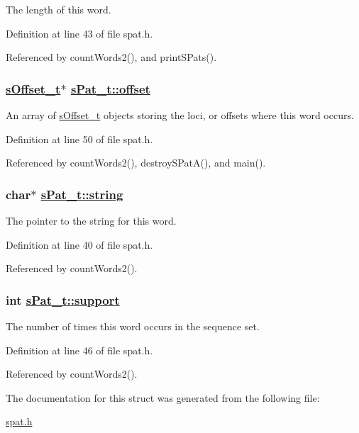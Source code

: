 The length of this word.

Definition at line 43 of file spat.h.

Referenced by count\-Words2(), and print\-SPats().\hypertarget{structsPat__t_o3}{
\subsubsection[offset]{\setlength{\rightskip}{0pt plus 5cm}\hyperlink{structsOffset__t}{s\-Offset\_\-t}$\ast$ \hyperlink{structsPat__t_o3}{s\-Pat\_\-t::offset}}}
\label{structsPat__t_o3}


An array of \hyperlink{structsOffset__t}{s\-Offset\_\-t} objects storing the loci, or offsets where this word occurs.

Definition at line 50 of file spat.h.

Referenced by count\-Words2(), destroy\-SPat\-A(), and main().\hypertarget{structsPat__t_o0}{
\subsubsection[string]{\setlength{\rightskip}{0pt plus 5cm}char$\ast$ \hyperlink{structsPat__t_o0}{s\-Pat\_\-t::string}}}
\label{structsPat__t_o0}


The pointer to the string for this word.

Definition at line 40 of file spat.h.

Referenced by count\-Words2().\hypertarget{structsPat__t_o2}{
\subsubsection[support]{\setlength{\rightskip}{0pt plus 5cm}int \hyperlink{structsPat__t_o2}{s\-Pat\_\-t::support}}}
\label{structsPat__t_o2}


The number of times this word occurs in the sequence set.

Definition at line 46 of file spat.h.

Referenced by count\-Words2().

The documentation for this struct was generated from the following file:\begin{CompactItemize}
\item 
\hyperlink{spat_8h}{spat.h}\end{CompactItemize}
